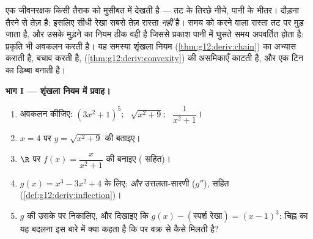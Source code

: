 \begin{problem}
\label{pb:g12:deriv:1}
एक जीवनरक्षक किसी तैराक को मुसीबत में देखती है --- तट के तिरछे नीचे, पानी के
भीतर। दौड़ना तैरने से तेज़ है: इसलिए सीधी रेखा सबसे तेज़ रास्ता \emph{नहीं}
है। समय को  करने वाला रास्ता तट पर मुड़ जाता है, और उसके मुड़ने का नियम
ठीक वही है जिससे प्रकाश पानी में घुसते समय अपवर्तित होता है: प्रकृति भी अवकलन
करती है। यह समस्या शृंखला नियम (\cref{thm:g12:deriv:chain}) का अभ्यास कराती है, बचाव करती है,
 (\cref{thm:g12:deriv:convexity}) की असमिकाएँ काटती है, और एक टिन का डिब्बा बनाती है।

\medskip
\noindent\textbf{भाग I --- शृंखला नियम में प्रवाह।}
\begin{enumerate}
  \item अवकलन कीजिए: $\left(3x^2 + 1\right)^5$; \ $\sqrt{x^2 + 9}$; \ $\dfrac{1}{x^2 + 1}$।
  \item $x = 4$ पर $y = \sqrt{x^2 + 9}$ की  बताइए।
  \item $\R$ पर $f(x) = \dfrac{x}{x^2 + 1}$ की  बनाइए ( सहित)।
  \item $g(x) = x^3 - 3x^2 + 4$ के लिए:  \emph{और} उत्तलता-सारणी ($g''$),
         सहित (\cref{def:g12:deriv:inflection})।
  \item $g$ की उसके  पर  निकालिए, और दिखाइए
        कि $g(x) - (\text{स्पर्श रेखा}) = (x - 1)^3$: चिह्न का यह बदलना इस बारे में क्या कहता है कि
         पर  वक्र से कैसे मिलती है?
\end{enumerate}


\end{problem}

